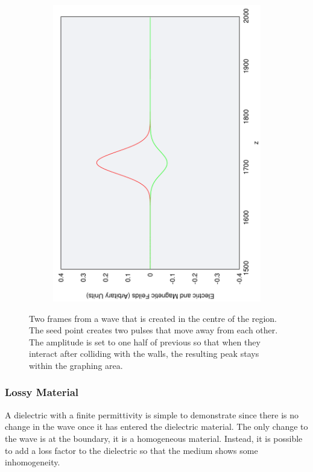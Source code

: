 \begin{figure}[ht]
\begin{subfigure}[ht]{0.45\textwidth}
                \includegraphics[angle=270, width=\textwidth]{gaussnoise2b.pdf}
        \end{subfigure}
        \caption{Two frames from a wave that is created in the centre of the region. The seed point creates two pulses that move away from each other. The amplitude is set to one half of previous so that when they interact after colliding with the walls, the resulting peak stays within the graphing area.}\label{fig:highresolutuion1}
\end{figure}

\subsubsection{Lossy Material} %
\label{ssub:lossy_material}
A dielectric with a finite permittivity is simple to demonstrate since there is no change in the wave once it has entered the dielectric material. The only change to the wave is at the boundary, it is a homogeneous material. Instead, it is possible to add a loss factor to the dielectric so that the medium shows some inhomogeneity.


